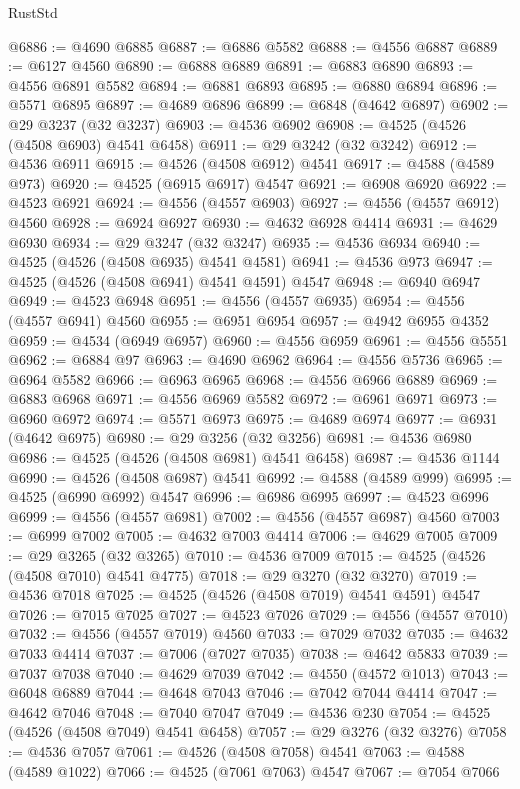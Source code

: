 \begin{lexlean}{RustStd}
\begin{coremodule}
{\begin{coremodule}
{{{{{{{{{{{{{{{{{{{{{{{{{{{{{{{{{{{{{{{{{{{{{{{{{{{{{{{@6886 := @4690 @6885
@6887 := @6886 @5582
@6888 := @4556 @6887
@6889 := @6127 @4560
@6890 := @6888 @6889
@6891 := @6883 @6890
@6893 := @4556 @6891 @5582
@6894 := @6881 @6893
@6895 := @6880 @6894
@6896 := @5571 @6895
@6897 := @4689 @6896
@6899 := @6848 (@4642 @6897)
@6902 := @29 @3237 (@32 @3237)
@6903 := @4536 @6902
@6908 := @4525 (@4526 (@4508 @6903) @4541 @6458)
@6911 := @29 @3242 (@32 @3242)
@6912 := @4536 @6911
@6915 := @4526 (@4508 @6912) @4541
@6917 := @4588 (@4589 @973)
@6920 := @4525 (@6915 @6917) @4547
@6921 := @6908 @6920
@6922 := @4523 @6921
@6924 := @4556 (@4557 @6903)
@6927 := @4556 (@4557 @6912) @4560
@6928 := @6924 @6927
@6930 := @4632 @6928 @4414
@6931 := @4629 @6930
@6934 := @29 @3247 (@32 @3247)
@6935 := @4536 @6934
@6940 := @4525 (@4526 (@4508 @6935) @4541 @4581)
@6941 := @4536 @973
@6947 := @4525 (@4526 (@4508 @6941) @4541 @4591) @4547
@6948 := @6940 @6947
@6949 := @4523 @6948
@6951 := @4556 (@4557 @6935)
@6954 := @4556 (@4557 @6941) @4560
@6955 := @6951 @6954
@6957 := @4942 @6955 @4352
@6959 := @4534 (@6949 @6957)
@6960 := @4556 @6959
@6961 := @4556 @5551
@6962 := @6884 @97
@6963 := @4690 @6962
@6964 := @4556 @5736
@6965 := @6964 @5582
@6966 := @6963 @6965
@6968 := @4556 @6966 @6889
@6969 := @6883 @6968
@6971 := @4556 @6969 @5582
@6972 := @6961 @6971
@6973 := @6960 @6972
@6974 := @5571 @6973
@6975 := @4689 @6974
@6977 := @6931 (@4642 @6975)
@6980 := @29 @3256 (@32 @3256)
@6981 := @4536 @6980
@6986 := @4525 (@4526 (@4508 @6981) @4541 @6458)
@6987 := @4536 @1144
@6990 := @4526 (@4508 @6987) @4541
@6992 := @4588 (@4589 @999)
@6995 := @4525 (@6990 @6992) @4547
@6996 := @6986 @6995
@6997 := @4523 @6996
@6999 := @4556 (@4557 @6981)
@7002 := @4556 (@4557 @6987) @4560
@7003 := @6999 @7002
@7005 := @4632 @7003 @4414
@7006 := @4629 @7005
@7009 := @29 @3265 (@32 @3265)
@7010 := @4536 @7009
@7015 := @4525 (@4526 (@4508 @7010) @4541 @4775)
@7018 := @29 @3270 (@32 @3270)
@7019 := @4536 @7018
@7025 := @4525 (@4526 (@4508 @7019) @4541 @4591) @4547
@7026 := @7015 @7025
@7027 := @4523 @7026
@7029 := @4556 (@4557 @7010)
@7032 := @4556 (@4557 @7019) @4560
@7033 := @7029 @7032
@7035 := @4632 @7033 @4414
@7037 := @7006 (@7027 @7035)
@7038 := @4642 @5833
@7039 := @7037 @7038
@7040 := @4629 @7039
@7042 := @4550 (@4572 @1013)
@7043 := @6048 @6889
@7044 := @4648 @7043
@7046 := @7042 @7044 @4414
@7047 := @4642 @7046
@7048 := @7040 @7047
@7049 := @4536 @230
@7054 := @4525 (@4526 (@4508 @7049) @4541 @6458)
@7057 := @29 @3276 (@32 @3276)
@7058 := @4536 @7057
@7061 := @4526 (@4508 @7058) @4541
@7063 := @4588 (@4589 @1022)
@7066 := @4525 (@7061 @7063) @4547
@7067 := @7054 @7066
}}}}}}}}}}}}}}}}}}}}}}}}}}}}}}}}}}}}}}}}}}}}}}}}}}}}}}}
\end{coremodule}}
\end{coremodule}
\end{lexlean}
